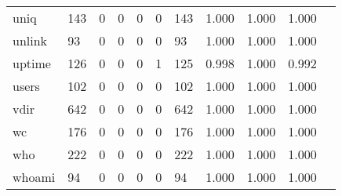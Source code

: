 \begin{longtable}{lp{1.10cm}p{1.10cm}p{1.10cm}p{1.10cm}p{1.10cm}p{1.10cm}p{1.10cm}p{1.10cm}p{1.10cm}p{1.10cm}}
uniq      &                    143 &                                  0 &                                 0 &                                0 &                                 0 &                             143 &                          1.000 &                                 1.000 &                               1.000 \\
unlink    &                     93 &                                  0 &                                 0 &                                0 &                                 0 &                              93 &                          1.000 &                                 1.000 &                               1.000 \\
uptime    &                    126 &                                  0 &                                 0 &                                0 &                                 1 &                             125 &                          0.998 &                                 1.000 &                               0.992 \\
users     &                    102 &                                  0 &                                 0 &                                0 &                                 0 &                             102 &                          1.000 &                                 1.000 &                               1.000 \\
vdir      &                    642 &                                  0 &                                 0 &                                0 &                                 0 &                             642 &                          1.000 &                                 1.000 &                               1.000 \\
wc        &                    176 &                                  0 &                                 0 &                                0 &                                 0 &                             176 &                          1.000 &                                 1.000 &                               1.000 \\
who       &                    222 &                                  0 &                                 0 &                                0 &                                 0 &                             222 &                          1.000 &                                 1.000 &                               1.000 \\
whoami    &                     94 &                                  0 &                                 0 &                                0 &                                 0 &                              94 &                          1.000 &                                 1.000 &                               1.000 \\

\end{longtable}
